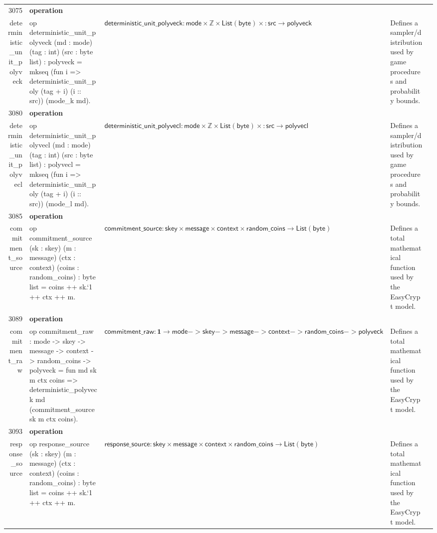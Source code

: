 \documentclass[10pt]{article}
\newcommand{\ec}[1]{\begingroup\ttfamily\scriptsize #1\endgroup}
\begin{document}
\begin{longtable}{r L{0.17\textwidth} L{0.26\textwidth} L{0.27\textwidth} L{0.20\textwidth}}
3075 & \textbf{operation}\\\ec{deterministic\_unit\_polyveck} & \ec{op deterministic\_unit\_polyveck (md : mode) (tag : int) (src : byte list) : polyveck = mkseq (fun i => deterministic\_unit\_poly (tag + i) (i :: src)) (mode\_k md).} & \(\mathsf{deterministic\_unit\_polyveck} : \mathsf{mode} \times \mathbb{Z} \times \mathsf{List}(\mathsf{byte}) \times \mathsf{: src} \to \mathsf{polyveck}\) & Defines a sampler/distribution used by game procedures and probability bounds. \\
3080 & \textbf{operation}\\\ec{deterministic\_unit\_polyvecl} & \ec{op deterministic\_unit\_polyvecl (md : mode) (tag : int) (src : byte list) : polyvecl = mkseq (fun i => deterministic\_unit\_poly (tag + i) (i :: src)) (mode\_l md).} & \(\mathsf{deterministic\_unit\_polyvecl} : \mathsf{mode} \times \mathbb{Z} \times \mathsf{List}(\mathsf{byte}) \times \mathsf{: src} \to \mathsf{polyvecl}\) & Defines a sampler/distribution used by game procedures and probability bounds. \\
3085 & \textbf{operation}\\\ec{commitment\_source} & \ec{op commitment\_source (sk : skey) (m : message) (ctx : context) (coins : random\_coins) : byte list = coins ++ sk.`1 ++ ctx ++ m.} & \(\mathsf{commitment\_source} : \mathsf{skey} \times \mathsf{message} \times \mathsf{context} \times \mathsf{random\_coins} \to \mathsf{List}(\mathsf{byte})\) & Defines a total mathematical function used by the EasyCrypt model. \\
3089 & \textbf{operation}\\\ec{commitment\_raw} & \ec{op commitment\_raw : mode -> skey -> message -> context -> random\_coins -> polyveck = fun md sk m ctx coins => deterministic\_polyveck md (commitment\_source sk m ctx coins).} & \(\mathsf{commitment\_raw} : \mathbf{1} \to \mathsf{mode -> skey -> message -> context -> random\_coins -> polyveck}\) & Defines a total mathematical function used by the EasyCrypt model. \\
3093 & \textbf{operation}\\\ec{response\_source} & \ec{op response\_source (sk : skey) (m : message) (ctx : context) (coins : random\_coins) : byte list = coins ++ sk.`1 ++ ctx ++ m.} & \(\mathsf{response\_source} : \mathsf{skey} \times \mathsf{message} \times \mathsf{context} \times \mathsf{random\_coins} \to \mathsf{List}(\mathsf{byte})\) & Defines a total mathematical function used by the EasyCrypt model. \\

\end{longtable}
\end{document}
